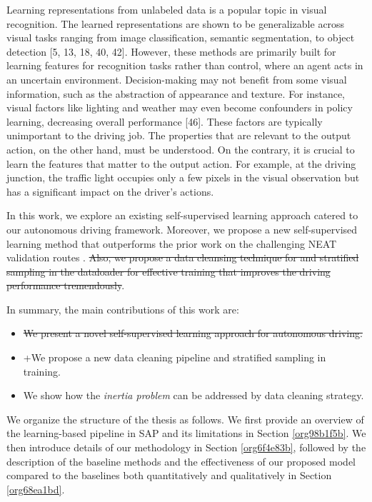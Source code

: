 \documentclass[letterpaper, 12pt]{article}
\theoremstyle{definition}
\theoremstyle{definition}
\theoremstyle{definition}
\theoremstyle{definition}
\theoremstyle{definition}
\begin{document}
Learning representations from unlabeled data is a popular topic in visual
recognition. The learned representations are shown to be generalizable across
visual tasks ranging from image classification, semantic segmentation, to object
detection [5, 13, 18, 40, 42]. However, these methods are primarily built for
learning features for recognition tasks rather than control, where an agent acts
in an uncertain environment. Decision-making may not benefit from some visual
information, such as the abstraction of appearance and texture. For instance,
visual factors like lighting and weather may even become confounders in policy
learning, decreasing overall performance [46]. These factors are typically
unimportant to the driving job. The properties that are relevant to the output
action, on the other hand, must be understood.
On the contrary, it is crucial
to learn the features that matter to the output action. For example, at the
driving junction, the traffic light occupies only a few pixels in the visual
observation but has a significant impact on the driver’s actions.

In this work, we explore an existing self-supervised learning approach catered
to our autonomous driving framework. Moreover, we propose a new self-supervised
learning method that outperforms the prior work on the challenging NEAT
validation routes \cite{Chitta2021}. \sout{Also, we propose a data cleansing
technique for and stratified sampling in the dataloader for effective training
that improves the driving performance tremendously}.



In summary, the main contributions of this work are:
\begin{itemize}
\item \sout{We present a novel self-supervised learning approach for autonomous driving.}
\item +We propose a new data cleaning pipeline and stratified sampling in training.
\item We show how the \emph{inertia problem} can be addressed by data cleaning strategy.
\end{itemize}

We organize the structure of the thesis as follows. We first provide an overview
of the learning-based pipeline in SAP and its limitations in Section \ref{org98b1f5b}. We
then introduce details of our methodology in Section \ref{org6f4e83b}, followed by the
description of the baseline methods and the effectiveness of our proposed model
compared to the baselines both quantitatively and qualitatively in Section
\ref{org68ea1bd}.
\end{document}
